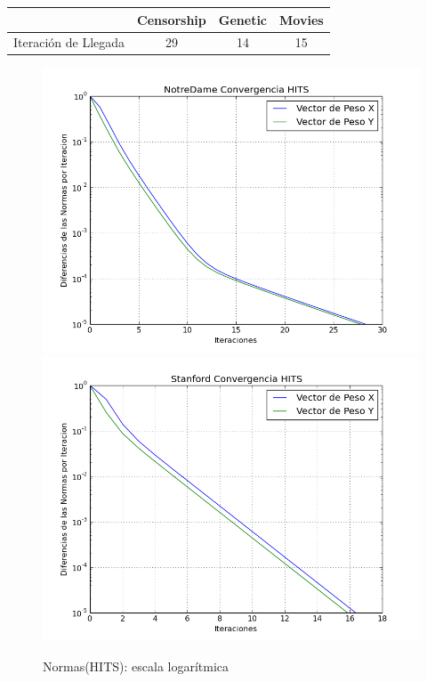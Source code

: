 \documentclass[a4paper]{article}
\begin{document}
\begin{center}

\begin{tabular}{r|c|c|c}
&  \textbf{Censorship} & \textbf{Genetic} & \textbf{Movies} \\ 
\hline
 Iteración de Llegada & 29 & 14 & 15\\

\end{tabular}


\end{center}


\begin{figure}[htbp]
\centering
\includegraphics[scale=0.385]{img/Normas-HITS-Notre.png}
\includegraphics[scale=0.385]{img/Norma-HITS-Stanford.png}
\caption{Normas(HITS): escala logarítmica}
\label{fig:graficos_cropflip}
\end{figure}
\end{document}
